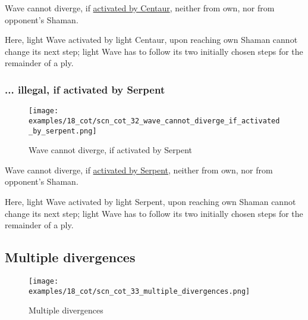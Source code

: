 \vspace*{-0.5\baselineskip}
Wave cannot diverge, if
\hyperref[fig:scn_hd_07_wave_activation_by_centaur_first_step]{activated by Centaur},
neither from own, nor from opponent's Shaman.

Here, light Wave activated by light Centaur, upon reaching own Shaman cannot change
its next step; light Wave has to follow its two initially chosen steps for the
remainder of a ply.

\clearpage %

\subsubsection*{... illegal, if activated by Serpent}
\label{sec:Conquest of Tlalocan/Divergence/... illegal, if activated by Serpent}

\vspace*{-1.4\baselineskip}
\noindent
\begin{figure}[!h]
\texttt{[image: examples/18\_cot/scn\_cot\_32\_wave\_cannot\_diverge\_if\_activated\_by\_serpent.png]}
\vspace*{-1.3\baselineskip}
\caption{Wave cannot diverge, if activated by Serpent}
\label{fig:scn_cot_32_wave_cannot_diverge_if_activated_by_serpent}
\end{figure}

\vspace*{-0.5\baselineskip}
Wave cannot diverge, if
\hyperref[fig:scn_tr_29_serpent_activating_wave]{activated by Serpent},
neither from own, nor from opponent's Shaman.

Here, light Wave activated by light Serpent, upon reaching own Shaman cannot change
its next step; light Wave has to follow its two initially chosen steps for the
remainder of a ply.

\clearpage %

\subsection*{Multiple divergences}
\label{sec:Conquest of Tlalocan/Divergence/Multiple divergences}

\vspace*{-1.4\baselineskip}
\noindent
\begin{figure}[!h]
\texttt{[image: examples/18\_cot/scn\_cot\_33\_multiple\_divergences.png]}
\vspace*{-1.3\baselineskip}
\caption{Multiple divergences}
\label{fig:scn_cot_33_multiple_divergences}
\end{figure}

